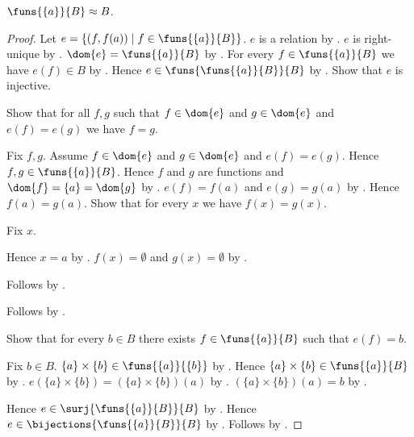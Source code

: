 \begin{proposition}\label{singleton_domain_function_space_equinum}
    $\funs{\{a\}}{B}\approx B$.
\end{proposition}
\begin{proof}
    Let $e=\{(f,f(a))\mid f\in\funs{\{a\}}{B}\}$.
    $e$ is a relation by .
    $e$ is right-unique by .
    $\dom{e}=\funs{\{a\}}{B}$
        by .
    For every $f\in\funs{\{a\}}{B}$ we have $e(f)\in B$
        by .
    Hence $e\in\funs{\funs{\{a\}}{B}}{B}$ by .
    Show that $e$ is injective.
    \begin{subproof}
        Show that for all $f,g$ such that $f\in\dom{e}$ and
            $g\in\dom{e}$ and $e(f)=e(g)$ we have $f=g$.
        \begin{subproof}
            Fix $f,g$.
            Assume $f\in\dom{e}$ and $g\in\dom{e}$ and $e(f)=e(g)$.
            Hence $f,g\in\funs{\{a\}}{B}$.
            Hence $f$ and $g$ are functions and
                $\dom{f}=\{a\}=\dom{g}$
                by .
            $e(f)=f(a)$ and $e(g)=g(a)$
                by .
            Hence $f(a)=g(a)$.
            Show that for every $x$ we have $f(x)=g(x)$.
            \begin{subproof}
                Fix $x$.
                \begin{byCase}
                        Hence $x=a$ by .
                        $f(x)=\emptyset$ and $g(x)=\emptyset$
                            by .
                \end{byCase}
            \end{subproof}
            Follows by .
        \end{subproof}
        Follows by .
    \end{subproof}
    Show that for every $b\in B$ there exists
        $f\in\funs{\{a\}}{B}$ such that $e(f)=b$.
    \begin{subproof}
        Fix $b\in B$.
        $\{a\}\times\{b\}\in\funs{\{a\}}{\{b\}}$
            by .
        Hence $\{a\}\times\{b\}\in\funs{\{a\}}{B}$
            by .
        $e(\{a\}\times\{b\})=(\{a\}\times\{b\})(a)$
            by .
        $(\{a\}\times\{b\})(a)=b$
            by .
    \end{subproof}
    Hence $e\in\surj{\funs{\{a\}}{B}}{B}$ by .
    Hence $e\in\bijections{\funs{\{a\}}{B}}{B}$
        by .
    Follows by .
\end{proof}

